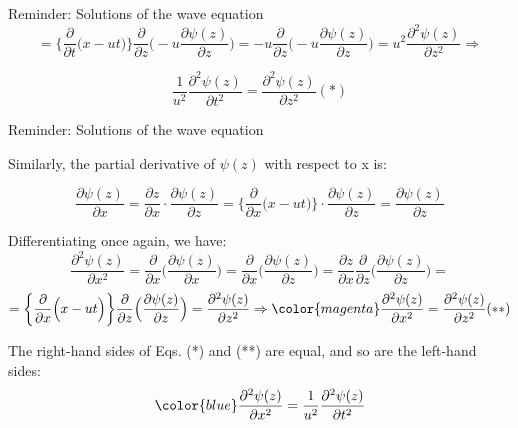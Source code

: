 {\begin{frame}{Reminder: Solutions of the wave equation}
\begin{equation*}
 = \bigg\{ \frac{\partial}{\partial t} \Big( x - ut \Big) \bigg\}  \frac{\partial}{\partial z} \Big(  -u \frac{\partial \psi(z)}{\partial z} \Big) =
  -u \frac{\partial}{\partial z} \Big(  -u \frac{\partial \psi(z)}{\partial z} \Big) =
   u^2 \frac{\partial^{2} \psi(z)}{\partial z^{2}} \Rightarrow
\end{equation*}

{\color{magenta}
\begin{equation*}
  \frac{1}{u^2} \frac{\partial^{2} \psi(z)}{\partial t^{2}} = \frac{\partial^{2} \psi(z)}{\partial z^{2}} (*)
\end{equation*}
}

\end{frame}

%
%
%
%

\begin{frame}{Reminder: Solutions of the wave equation}

Similarly, the partial derivative of  $\psi(z)$ with respect to x is:

\begin{equation*}
  \frac{\partial \psi(z)}{\partial x} =
  \frac{\partial z}{\partial x} \cdot \frac{\partial \psi(z)}{\partial z} =
  \bigg\{ \frac{\partial}{\partial x} \Big( x - ut \Big) \bigg\} \cdot \frac{\partial \psi(z)}{\partial z} =
  \frac{\partial \psi(z)}{\partial z}
\end{equation*}

Differentiating once again, we have:
\begin{equation*}
  \frac{\partial^{2} \psi(z)}{\partial x^{2}} =
  \frac{\partial}{\partial x} \Big( \frac{\partial \psi(z)}{\partial x} \Big) =
  \frac{\partial}{\partial x} \Big( \frac{\partial \psi(z)}{\partial z} \Big) =
  \frac{\partial z}{\partial x} \frac{\partial}{\partial z} \Big( \frac{\partial \psi(z)}{\partial z} \Big) =
\end{equation*}
\begin{equation*}
  =  \bigg\{ \frac{\partial}{\partial x} \Big( x - ut \Big) \bigg\} \frac{\partial}{\partial z} \Big( \frac{\partial \psi(z)}{\partial z} \Big) =
   \frac{\partial^{2} \psi(z)}{\partial z^{2}} \Rightarrow
   {\color{magenta} \frac{\partial^{2} \psi(z)}{\partial x^{2}} =  \frac{\partial^{2} \psi(z)}{\partial z^{2}} } (**)
\end{equation*}

The right-hand sides of Eqs. (*) and (**) are equal, and so are the left-hand sides:
\begin{equation*}
   {\color{blue} \frac{\partial^{2} \psi(z)}{\partial x^{2}} =   \frac{1}{u^2} \frac{\partial^{2} \psi(z)}{\partial t^{2}} }
\end{equation*}


\end{frame}}

